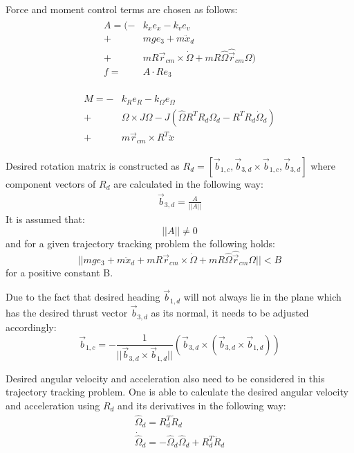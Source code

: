 Force and moment control terms are chosen as follows:
\begin{align}
	\begin{split}
		A = (-& k_x e_x - k_v e_v \\
		+& mge_3 + m\ddot{x}_d \\
		+& mR\vec{r}_{cm}  \times \dot{\Omega} + mR\hat{\Omega}\hat{\vec{r}}_{cm}\Omega ) \\
		f =& A \cdot Re_3 \label{force_control}
	\end{split}
\end{align}

\begin{align}
	\begin{split}
		M = -& k_R e_R - k_\Omega e_\Omega \\
			+& \Omega \times J\Omega - J(\hat{\Omega}R^TR_d\Omega_d - R^TR_d\dot{\Omega}_d) \\
			+& m\vec{r}_{cm} \times R^T \ddot{x}  \label{moment_control}
	\end{split}
\end{align}

Desired rotation matrix is constructed as 
$R_d = [\vec{b}_{1,c}, \vec{b}_{3,d} \times \vec{b}_{1,c}, \vec{b}_{3,d}]$ where component vectors of $R_d$ are calculated in the following way:
\begin{gather}
	\vec{b}_{3,d} = \frac{A}{|| A ||}
\end{gather}
\noindent It is assumed that:
\begin{equation}
	|| A || \neq 0 \label{condition1}
\end{equation}
and for a given trajectory tracking problem the following holds:
\begin{equation}
	|| mge_3 + m\ddot{x}_d 
	+ mR\vec{r}_{cm}  \times \dot{\Omega} + mR\hat{\Omega}\hat{\vec{r}}_{cm}\Omega|| < B \label{condition2}
\end{equation}
for a positive constant B.

Due to the fact that desired heading $\vec{b}_{1,d}$ will not always lie in the plane which has the desired thrust vector $\vec{b}_{3,d}$ as its normal, it needs to be adjusted accordingly:
\begin{equation}
	\vec{b}_{1,c} = -\frac{1}{||\vec{b}_{3,d} \times \vec{b}_{1,d}||}(\vec{b}_{3,d} \times (\vec{b}_{3,d} \times \vec{b}_{1,d}))
\end{equation}

Desired angular velocity and acceleration also need to be considered in this trajectory tracking problem. One is able to calculate the desired angular velocity and acceleration using $R_d$ and its derivatives in the following way:
\begin{gather}
	\hat{\Omega}_d = R_d^T \dot{R}_d \\
	\dot{\hat{\Omega}}_d = - \hat{\Omega}_d\hat{\Omega}_d + R_d^T \ddot{R}_d
\end{gather}

